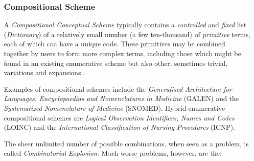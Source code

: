 %
%
%
%
%
%
%

\subsubsection{Compositional Scheme}
\label{compositional_scheme_heading}

A \emph{Compositional Conceptual Scheme} typically contains a \emph{controlled}
and \emph{fixed} list (\emph{Dictionary}) of a relatively small number (a few
ten-thousand) of \emph{primitive} terms, each of which can have a unique code.
These primitives may be combined together by users to form more complex terms,
including those which might be found in an existing enumerative scheme but also
other, sometimes trivial, variations and expansions \cite{rogers}.

Examples of compositional schemes include the \emph{Generalised Architecture
for Languages, Encyclopaedias and Nomenclatures in Medicine} (GALEN) and the
\emph{Systematized Nomenclature of Medicine} (SNOMED). Hybrid
enumerative-compositional schemes are
\emph{Logical Observation Identifiers, Names and Codes} (LOINC) and the
\emph{International Classification of Nursing Procedures} (ICNP).

The sheer unlimited number of possible combinations, when seen as a problem, is
called \emph{Combinatorial Explosion}. Much worse problems, however, are the:

